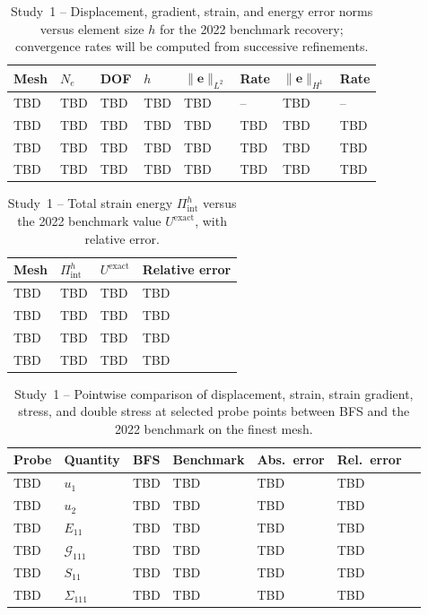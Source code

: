 \documentclass[11pt]{article}
\begin{document}
\begin{table}[h]
\centering
\caption{Study~1 -- Displacement, gradient, strain, and energy
  error norms versus element size $h$ for the 2022 benchmark
  recovery; convergence rates will be computed from successive
  refinements.}
\label{tab:s9_disp_bench}
\begin{tabular}{llllllll}
\toprule
Mesh & $N_e$ & DOF & $h$ & $\|\mathbf{e}\|_{L^2}$ &
Rate & $\|\mathbf{e}\|_{H^1}$ & Rate \\
\midrule
TBD & TBD & TBD & TBD & TBD & -- & TBD & -- \\
TBD & TBD & TBD & TBD & TBD & TBD & TBD & TBD \\
TBD & TBD & TBD & TBD & TBD & TBD & TBD & TBD \\
TBD & TBD & TBD & TBD & TBD & TBD & TBD & TBD \\
\bottomrule
\end{tabular}
\end{table}

\begin{table}[h]
\centering
\caption{Study~1 -- Total strain energy $\Pi_{\mathrm{int}}^{h}$
  versus the 2022 benchmark value $U^{\mathrm{exact}}$, with
  relative error.}
\label{tab:s9_energy_bench}
\begin{tabular}{llll}
\toprule
Mesh & $\Pi_{\mathrm{int}}^{h}$ & $U^{\mathrm{exact}}$ &
Relative error \\
\midrule
TBD & TBD & TBD & TBD \\
TBD & TBD & TBD & TBD \\
TBD & TBD & TBD & TBD \\
TBD & TBD & TBD & TBD \\
\bottomrule
\end{tabular}
\end{table}

\begin{table}[h]
\centering
\caption{Study~1 -- Pointwise comparison of displacement, strain,
  strain gradient, stress, and double stress at selected probe
  points between BFS and the 2022 benchmark on the finest mesh.}
\label{tab:s9_field_bench}
\begin{tabular}{lllllll}
\toprule
Probe & Quantity & BFS & Benchmark & Abs.\ error & Rel.\ error \\
\midrule
TBD & $u_1$ & TBD & TBD & TBD & TBD \\
TBD & $u_2$ & TBD & TBD & TBD & TBD \\
TBD & $E_{11}$ & TBD & TBD & TBD & TBD \\
TBD & $\mathcal{G}_{111}$ & TBD & TBD & TBD & TBD \\
TBD & $S_{11}$ & TBD & TBD & TBD & TBD \\
TBD & $\Sigma_{111}$ & TBD & TBD & TBD & TBD \\
\bottomrule
\end{tabular}
\end{table}
\end{document}
